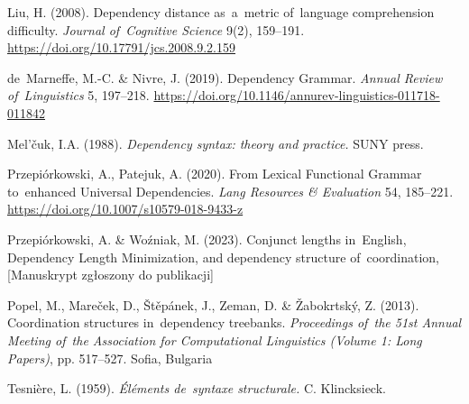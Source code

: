 \documentclass[licencjacka]{pracamgr_Kogni}
\begin{document}
\begin{thebibliography}{99}
Liu, H. (2008). Dependency distance as~a~metric of~language comprehension difficulty. \textit{Journal of~Cognitive Science} 9(2), 159–191. \url{https://doi.org/10.17791/jcs.2008.9.2.159}

de~Marneffe, M.-C. \& Nivre, J. (2019). Dependency Grammar. \textit{Annual Review of~Linguistics} 5, 197–218. \url{https://doi.org/10.1146/annurev-linguistics-011718-011842}

Mel'čuk, I.A. (1988). \textit{Dependency syntax: theory and practice.} SUNY press. %

Przepiórkowski, A., Patejuk, A. (2020). From Lexical Functional Grammar to~enhanced Universal Dependencies. \textit{Lang Resources \& Evaluation} 54, 185–221. \url{https://doi.org/10.1007/s10579-018-9433-z}

Przepiórkowski, A. \& Woźniak, M. (2023). Conjunct lengths in~English, Dependency Length Minimization, and dependency structure of~coordination, [Manuskrypt zgłoszony do publikacji] %

Popel, M., Mareček, D., Štěpánek, J., Zeman, D. \& Žabokrtský, Z. (2013). Coordination structures in~dependency treebanks. \textit{Proceedings of~the 51st Annual Meeting of~the Association for Computational Linguistics (Volume 1: Long Papers)}, pp. 517–527. Sofia, Bulgaria

Tesnière, L. (1959). \textit{Éléments de~syntaxe structurale.} C. Klincksieck. %

\end{thebibliography}
\end{document}

